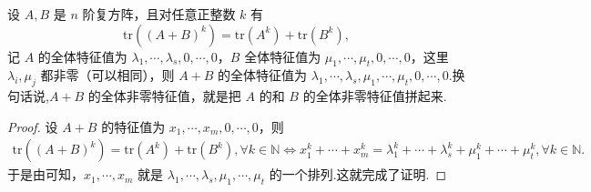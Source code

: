 \documentclass[../../main.tex]{subfiles}
\begin{document}
\begin{proposition}\label{proposition:命题24}
设 $A,B$ 是 $n$ 阶复方阵，且对任意正整数 $k$ 有 $$\mathrm{tr}((A+B)^k)=\mathrm{tr}(A^k)+\mathrm{tr}(B^k),$$记 $A$ 的全体特征值为 $\lambda_1,\cdots,\lambda_s,0,\cdots,0$，$B$ 全体特征值为 $\mu_1,\cdots,\mu_t,0,\cdots,0$，这里 $\lambda_i,\mu_j$ 都非零（可以相同），则 $A+B$ 的全体特征值为 $\lambda_1,\cdots,\lambda_s,\mu_1,\cdots,\mu_t,0,\cdots,0$.换句话说,$A+B$ 的全体非零特征值，就是把 $A$ 的和 $B$ 的全体非零特征值拼起来.
\end{proposition}
\begin{proof}
设 $A+B$ 的特征值为 $x_1,\cdots ,x_m,0,\cdots ,0$，则
\begin{align*}
\mathrm{tr}\left( \left( A+B \right) ^k \right) =\mathrm{tr}\left( A^k \right) +\mathrm{tr}\left( B^k \right) ,\forall k\in \mathbb{N} 
\Longleftrightarrow x_{1}^{k}+\cdots +x_{m}^{k}=\lambda _{1}^{k}+\cdots +\lambda _{s}^{k}+\mu _{1}^{k}+\cdots +\mu _{t}^{k},\forall k\in \mathbb{N} .
\end{align*}
于是由可知，$x_1,\cdots ,x_m$ 就是 $\lambda _1,\cdots ,\lambda _s,\mu _1,\cdots ,\mu _t$ 的一个排列.这就完成了证明.

\end{proof}
\end{document}
